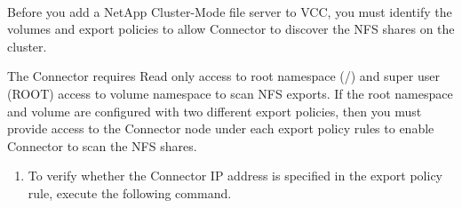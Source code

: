 \documentclass[letterpaper,10pt,english]{sphinxmanual}
\begin{document}
\paragraph{}
\label{\detokenize{mcdmp_app_ug:enabling-export-of-nfs-shares-on-a-netapp-cluster-mode-file-server}}
Before you add a NetApp Cluster-Mode file server to VCC, you must identify the volumes and export policies to allow Connector to discover the NFS shares on the cluster.

The Connector requires Read only access to root namespace (/) and super user (ROOT) access to volume namespace to scan NFS exports. If the root namespace and volume are configured with two different export policies, then you must provide access to the Connector node under each export policy rules to enable Connector to scan the NFS shares.

\begin{enumerate}
\item {} 
To verify whether the Connector IP address is specified in the export policy rule, execute the following command.

\end{enumerate}
\begin{quote}

\end{quote}
\end{document}

